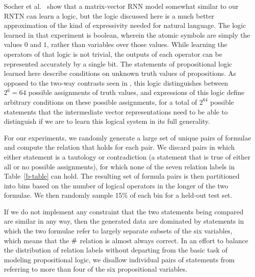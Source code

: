 Socher et al.~ show that a matrix-vector RNN
model somewhat similar to our RNTN can learn a logic, but the logic
discussed here is a much better approximation of the kind of
expressivity needed for natural language. The logic learned in that
experiment is boolean, wherein the atomic symbols are simply the
values $0$ and $1$, rather than variables over those values. While
learning the operators of that logic is not trivial, the outputs of
each operator can be represented accurately by a single bit. The
statements of propositional logic learned here describe conditions on
unknown truth values of propositions. As opposed to the two-way
contrasts seen in , this logic distinguishes
between $2^{6} = 64$ possible assignments of truth values, and
expressions of this logic define arbitrary conditions on these
possible assignments, for a total of $2^{64}$ %
possible statements that the intermediate vector representations need
to be able to distinguish if we are to learn this logical system in its
full generality.

For our experiments, we randomly generate a large set of  unique pairs 
of formulae and compute the relation that holds for each pair.
We discard pairs in which either statement is a tautology or
contradiction (a statement that is true of either all or no possible
assignments), for which none of the seven relation labels in
Table~\ref{b-table} can hold. The resulting set of formula pairs is
then partitioned into bins based on the number of logical operators in
the longer of the two formulae. We then randomly sample 15\% of each
bin for a held-out test set.

If we do not implement any constraint that the two statements being
compared are similar in any way, then the generated data are dominated
by statements in which the two formulae refer to largely separate
subsets of the six variables, which means that the $\mathbin{\#}$ relation
is almost always correct.  In an effort to balance the distribution of
relation labels without departing from the basic task of modeling
propositional logic, we disallow individual pairs of statements from
referring to more than four of the six propositional variables.

